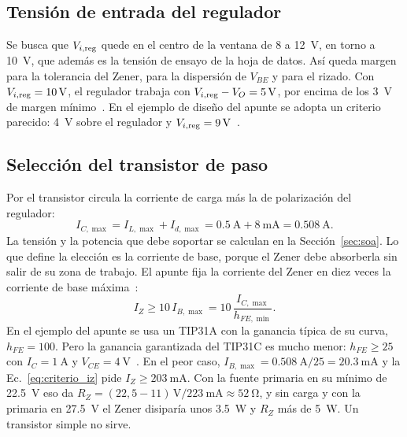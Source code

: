 \subsection{Tensión de entrada del regulador}
Se busca que $V_{i,\mathrm{reg}}$ quede en el centro de la ventana de \SI{8}{} a \SI{12}{\volt}, en torno a \SI{10}{\volt}, que además es la tensión de ensayo de la hoja de datos. Así queda margen para la tolerancia del Zener, para la dispersión de $V_{BE}$ y para el rizado. Con $V_{i,\mathrm{reg}} = \SI{10}{\volt}$, el regulador trabaja con $V_{i,\mathrm{reg}} - V_O = \SI{5}{\volt}$, por encima de los \SI{3}{\volt} de margen mínimo~\cite[Ec.~15-8]{coughlin}. En el ejemplo de diseño del apunte se adopta un criterio parecido: \SI{4}{\volt} sobre el regulador y $V_{i,\mathrm{reg}} = \SI{9}{\volt}$~\cite[Sec.~6-9-5h]{ap3}.

\subsection{Selección del transistor de paso}
\label{sec:seleccion_transistor}
Por el transistor circula la corriente de carga más la de polarización del regulador:
\begin{equation}
    I_{C,\max} = I_{L,\max} + I_{d,\max} = \SI{0,5}{\ampere} + \SI{8}{\milli\ampere} = \SI{0,508}{\ampere}.
\end{equation}
La tensión y la potencia que debe soportar se calculan en la Sección~\ref{sec:soa}. Lo que define la elección es la corriente de base, porque el Zener debe absorberla sin salir de su zona de trabajo. El apunte fija la corriente del Zener en diez veces la corriente de base máxima~\cite[Sec.~6-9-5h]{ap3}:
\begin{equation}
    I_{Z} \geq 10\, I_{B,\max} = 10\, \frac{I_{C,\max}}{h_{FE,\min}}.
    \label{eq:criterio_iz}
\end{equation}
En el ejemplo del apunte se usa un TIP31A con la ganancia típica de su curva, $h_{FE} = 100$. Pero la ganancia garantizada del TIP31C es mucho menor: $h_{FE} \geq 25$ con $I_C = \SI{1}{\ampere}$ y $V_{CE} = \SI{4}{\volt}$~\cite{tip31}. En el peor caso, $I_{B,\max} = \SI{0,508}{\ampere}/25 = \SI{20,3}{\milli\ampere}$ y la Ec.~\eqref{eq:criterio_iz} pide $I_Z \geq \SI{203}{\milli\ampere}$. Con la fuente primaria en su mínimo de \SI{22,5}{\volt} eso da $R_Z = (22{,}5 - 11)\,\si{\volt}/\SI{223}{\milli\ampere} \approx \SI{52}{\ohm}$, y sin carga y con la primaria en \SI{27,5}{\volt} el Zener disiparía unos \SI{3,5}{\watt} y $R_Z$ más de \SI{5}{\watt}. Un transistor simple no sirve.


